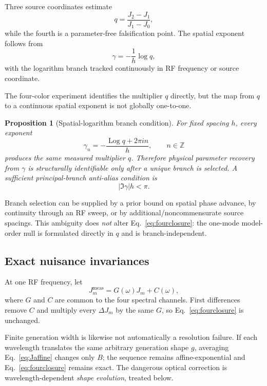 \documentclass[11pt]{article}
\newtheorem{proposition}{Proposition}
\begin{document}
Three source coordinates estimate
\begin{equation}
\boxed{q=\frac{J_2-J_1}{J_1-J_0},}
\label{eq:qrecover}
\end{equation}
while the fourth is a parameter-free falsification point. The spatial exponent follows from
\begin{equation}
\boxed{\gamma=-\frac{1}{h}\log q,}
\label{eq:grecover}
\end{equation}
with the logarithm branch tracked continuously in RF frequency or source coordinate.

The four-color experiment identifies the multiplier $q$ directly, but the map from $q$ to a continuous spatial exponent is not globally one-to-one.
\begin{proposition}[Spatial-logarithm branch condition]
For fixed spacing $h$, every exponent
\begin{equation}
\boxed{\gamma_n=-\frac{\operatorname{Log}q+2\pi i n}{h},\qquad n\in\mathbb Z}
\label{eq:spatial_alias}
\end{equation}
produces the same measured multiplier $q$. Therefore physical parameter recovery from $\gamma$ is structurally identifiable only after a unique branch is selected. A sufficient principal-branch anti-alias condition is
\begin{equation}
\boxed{|\Im\gamma|h<\pi.}
\label{eq:spatial_antialias}
\end{equation}
\end{proposition}
Branch selection can be supplied by a prior bound on spatial phase advance, by continuity through an RF sweep, or by additional/noncommensurate source spacings. This ambiguity does \emph{not} alter Eq.~\eqref{eq:fourclosure}: the one-mode model-order null is formulated directly in $q$ and is branch-independent.

\subsection{Exact nuisance invariances}

At one RF frequency, let
\begin{equation}
J_m^{\mathrm{meas}}=G(\omega)J_m+C(\omega),
\end{equation}
where $G$ and $C$ are common to the four spectral channels. First differences remove $C$ and multiply every $\Delta J_m$ by the same $G$, so Eq.~\eqref{eq:fourclosure} is unchanged.

Finite generation width is likewise not automatically a resolution failure. If each wavelength translates the same arbitrary generation shape $g$, averaging Eq.~\eqref{eq:Jaffine} changes only $B$; the sequence remains affine-exponential and Eq.~\eqref{eq:fourclosure} remains exact. The dangerous optical correction is wavelength-dependent \emph{shape evolution}, treated below.
\end{document}
